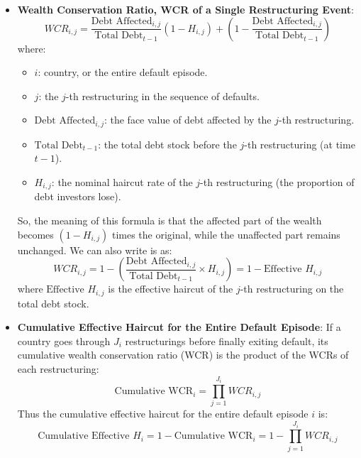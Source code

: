 \begin{itemize}
    \item \textbf{Wealth Conservation Ratio, WCR of a Single Restructuring Event}:
    \begin{equation} \label{eq:wcr}
        WCR_{i,j} = \frac{\text{Debt Affected}_{i,j}}{\text{Total Debt}_{t-1}} (1 - H_{i,j}) + \left(1 - \frac{\text{Debt Affected}_{i,j}}{\text{Total Debt}_{t-1}}\right)
    \end{equation}
    where:
    \begin{itemize}
        \item $i$: country, or the entire default episode.
        \item $j$: the $j$-th restructuring in the sequence of defaults.
        \item $\text{Debt Affected}_{i,j}$: the face value of debt affected by the $j$-th restructuring.
        \item $\text{Total Debt}_{t-1}$: the total debt stock before the $j$-th restructuring (at time $t-1$).
        \item $H_{i,j}$: the nominal haircut rate of the $j$-th restructuring (the proportion of debt investors lose).
    \end{itemize}
    So, the meaning of this formula is that the affected part of the wealth becomes $(1 - H_{i,j})$ times the original, while the unaffected part remains unchanged.
    We can also write is as:
    \begin{equation}
        WCR_{i,j} = 1 - \left(\frac{\text{Debt Affected}_{i,j}}{\text{Total Debt}_{t-1}} \times H_{i,j}\right) = 1 - \text{Effective } H_{i,j}
    \end{equation}
    where $\text{Effective } H_{i,j}$ is the effective haircut of the $j$-th restructuring on the total debt stock.

    \item \textbf{Cumulative Effective Haircut for the Entire Default Episode}:
    If a country goes through $J_i$ restructurings before finally exiting default, its cumulative wealth conservation ratio (WCR) is the product of the WCRs of each restructuring:
    \begin{equation}
        \text{Cumulative WCR}_i = \prod_{j=1}^{J_i} WCR_{i,j}
    \end{equation}
    Thus the cumulative effective haircut for the entire default episode $i$ is:
    \begin{equation} \label{eq:cum_haircut}
        \text{Cumulative Effective } H_i = 1 - \text{Cumulative WCR}_i = 1 - \prod_{j=1}^{J_i} WCR_{i,j}
    \end{equation}


\end{itemize}
